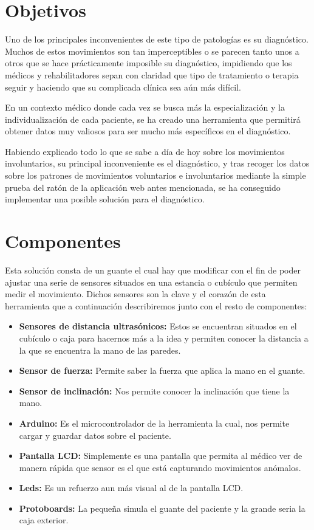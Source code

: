 
\section{Objetivos}
Uno de los principales inconvenientes de este tipo de patologías es su diagnóstico.
Muchos de estos movimientos son tan imperceptibles o se parecen tanto unos a otros que se hace prácticamente imposible su diagnóstico, impidiendo que los médicos y rehabilitadores sepan con claridad que tipo de tratamiento o terapia seguir y haciendo que su complicada clínica sea aún más difícil.

En un contexto médico donde cada vez se busca más la especialización y la individualización de cada paciente, se ha creado una herramienta que  permitirá obtener datos muy valiosos para ser mucho más específicos en el diagnóstico.

Habiendo explicado todo lo que se sabe a día de hoy sobre los movimientos involuntarios, su principal inconveniente es el diagnóstico, y tras recoger los datos sobre los patrones de movimientos voluntarios e involuntarios mediante la simple prueba del ratón de la aplicación web antes mencionada, se ha conseguido implementar una posible solución para el diagnóstico.

\clearpage

\section{Componentes}

Esta solución consta de un guante el cual hay que modificar con el fin de poder ajustar una serie de sensores situados en una estancia o cubículo que permiten medir el movimiento. Dichos sensores son la clave y el corazón de esta herramienta que a continuación describiremos junto con el resto de componentes:

\begin{itemize}
    \item \textbf{Sensores de distancia ultrasónicos:} Estos se encuentran situados en el cubículo o caja para hacernos más a la idea y permiten conocer la distancia a la que se encuentra la mano de las paredes.
    \item \textbf{Sensor de fuerza:} Permite saber la fuerza que aplica la mano en el guante.
    \item \textbf{Sensor de inclinación:} Nos permite conocer la inclinación que tiene la mano.
    \item \textbf{Arduino:} Es el microcontrolador de la herramienta la cual, nos permite cargar y guardar datos sobre el paciente.
    \item \textbf{Pantalla LCD:} Simplemente es una pantalla que permita al médico ver de manera rápida que sensor es el que está capturando movimientos anómalos.
    \item \textbf{Leds:} Es un refuerzo aun más visual al de la pantalla LCD. 
    \item  \textbf{Protoboards:} La pequeña simula el guante del paciente y la grande seria la caja exterior.
\end{itemize}

